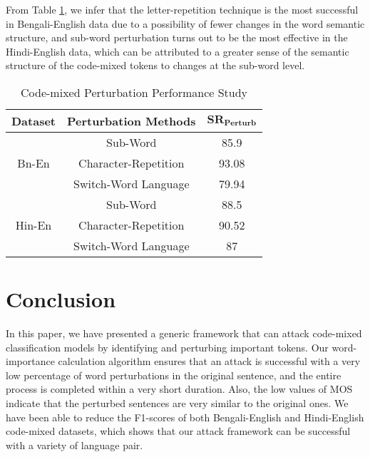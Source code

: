 \documentclass[sigconf]{acmart}
\begin{document}
From Table \ref{ablation_study}, we infer that the letter-repetition technique is the most successful in Bengali-English data due to a possibility of fewer changes in the word semantic structure, and sub-word perturbation turns out to be the most effective in the Hindi-English data, which can be attributed to a greater sense of the semantic structure of the code-mixed tokens to changes at the sub-word level.
\begin{table}[]
\small
\centering
\caption{Code-mixed Perturbation Performance Study}
\begin{tabular}{|c|c|c|} 
\hline
\textbf{Dataset} & \textbf{Perturbation Methods} & $\mathbf{SR_{Perturb}}$ \\
\hline
\multirow{3}{*}{Bn-En} & Sub-Word & 85.9 \\ 
\cline{2-3}
 & Character-Repetition & 93.08 \\ 
\cline{2-3}
 & Switch-Word Language & 79.94 \\ 
\hline
\multirow{3}{*}{Hin-En} & Sub-Word & 88.5 \\ 
\cline{2-3}
 & Character-Repetition & 90.52 \\ 
\cline{2-3}
 & Switch-Word Language & 87 \\
\hline
\end{tabular}
\label{ablation_study}
\end{table}
\vspace{-6pt}
\section{Conclusion}
In this paper, we have presented a generic framework that can attack code-mixed classification models by identifying and perturbing important tokens. 
Our word-importance calculation algorithm ensures that an attack is successful with a very low percentage of word perturbations in the original sentence, and the entire process is completed within a very short duration. Also, the low values of MOS indicate that the perturbed sentences are very similar to the original ones. We have been able to reduce the F1-scores of both Bengali-English and Hindi-English code-mixed datasets, which shows that our attack framework can be successful with a variety of language pair. 
\end{document}
